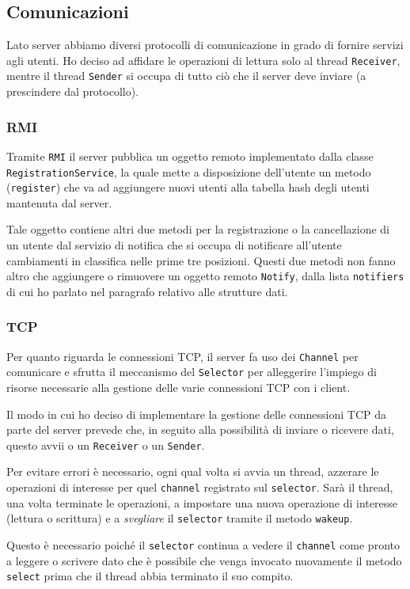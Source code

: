 \subsection{Comunicazioni}
Lato server abbiamo diversi protocolli di comunicazione in grado di fornire servizi agli utenti.
Ho deciso ad affidare le operazioni di lettura solo al thread \verb|Receiver|, mentre il thread
\verb|Sender| si occupa di tutto ciò che il server deve inviare (a prescindere dal protocollo).

\subsubsection{RMI}
Tramite \verb|RMI| il server pubblica un oggetto remoto implementato dalla classe
\verb|RegistrationService|, la quale mette a disposizione dell'utente un metodo (\verb|register|)
che va ad aggiungere nuovi utenti alla tabella hash degli utenti mantenuta dal server.

Tale oggetto contiene altri due metodi per la registrazione o la cancellazione di un utente dal
servizio di notifica che si occupa di notificare all'utente cambiamenti in classifica nelle prime
tre posizioni. Questi due metodi non fanno altro che aggiungere o rimuovere un oggetto remoto
\verb|Notify|, dalla lista \verb|notifiers| di cui ho parlato nel paragrafo relativo alle strutture
dati.

\subsubsection{TCP}
Per quanto riguarda le connessioni TCP, il server fa uso dei \verb|Channel| per comunicare e
sfrutta il meccanismo del \verb|Selector| per alleggerire l'impiego di risorse necessarie alla
gestione delle varie connessioni TCP con i client.

Il modo in cui ho deciso di implementare la gestione delle connessioni TCP da parte del server
prevede che, in seguito alla possibilità di inviare o ricevere dati, questo avvii o un
\verb|Receiver| o un \verb|Sender|.

Per evitare errori è necessario, ogni qual volta si avvia un thread, azzerare le operazioni di
interesse per quel \verb|channel| registrato sul \verb|selector|. Sarà il thread, una volta
terminate le operazioni, a impostare una nuova operazione di interesse (lettura o scrittura) e a
\emph{svegliare} il \verb|selector| tramite il metodo \verb|wakeup|.

Questo è necessario poiché il \verb|selector| continua a vedere il \verb|channel| come pronto a
leggere o scrivere dato che è possibile che venga invocato nuovamente il metodo \verb|select|
prima che il thread abbia terminato il suo compito.

